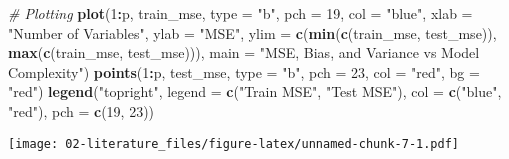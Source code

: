 \documentclass[
]{article}
\newenvironment{Shaded}{\begin{snugshade}}{\end{snugshade}}
\newcommand{\AttributeTok}[1]{\textcolor[rgb]{0.13,0.29,0.53}{#1}}
\newcommand{\CommentTok}[1]{\textcolor[rgb]{0.56,0.35,0.01}{\textit{#1}}}
\newcommand{\DecValTok}[1]{\textcolor[rgb]{0.00,0.00,0.81}{#1}}
\newcommand{\FunctionTok}[1]{\textcolor[rgb]{0.13,0.29,0.53}{\textbf{#1}}}
\newcommand{\NormalTok}[1]{#1}
\newcommand{\SpecialCharTok}[1]{\textcolor[rgb]{0.81,0.36,0.00}{\textbf{#1}}}
\newcommand{\StringTok}[1]{\textcolor[rgb]{0.31,0.60,0.02}{#1}}
\begin{document}
\begin{Shaded}
\begin{Highlighting}[]
\CommentTok{\# Plotting}
\FunctionTok{plot}\NormalTok{(}\DecValTok{1}\SpecialCharTok{:}\NormalTok{p, train\_mse, }\AttributeTok{type =} \StringTok{"b"}\NormalTok{, }\AttributeTok{pch =} \DecValTok{19}\NormalTok{, }\AttributeTok{col =} \StringTok{"blue"}\NormalTok{, }\AttributeTok{xlab =} \StringTok{"Number of Variables"}\NormalTok{, }\AttributeTok{ylab =} \StringTok{"MSE"}\NormalTok{, }\AttributeTok{ylim =} \FunctionTok{c}\NormalTok{(}\FunctionTok{min}\NormalTok{(}\FunctionTok{c}\NormalTok{(train\_mse, test\_mse)), }\FunctionTok{max}\NormalTok{(}\FunctionTok{c}\NormalTok{(train\_mse, test\_mse))), }\AttributeTok{main =} \StringTok{"MSE, Bias, and Variance vs Model Complexity"}\NormalTok{)}
\FunctionTok{points}\NormalTok{(}\DecValTok{1}\SpecialCharTok{:}\NormalTok{p, test\_mse, }\AttributeTok{type =} \StringTok{"b"}\NormalTok{, }\AttributeTok{pch =} \DecValTok{23}\NormalTok{, }\AttributeTok{col =} \StringTok{"red"}\NormalTok{, }\AttributeTok{bg =} \StringTok{"red"}\NormalTok{)}
\FunctionTok{legend}\NormalTok{(}\StringTok{"topright"}\NormalTok{, }\AttributeTok{legend =} \FunctionTok{c}\NormalTok{(}\StringTok{"Train MSE"}\NormalTok{, }\StringTok{"Test MSE"}\NormalTok{), }\AttributeTok{col =} \FunctionTok{c}\NormalTok{(}\StringTok{"blue"}\NormalTok{, }\StringTok{"red"}\NormalTok{), }\AttributeTok{pch =} \FunctionTok{c}\NormalTok{(}\DecValTok{19}\NormalTok{, }\DecValTok{23}\NormalTok{))}
\end{Highlighting}
\end{Shaded}

\texttt{[image: 02-literature\_files/figure-latex/unnamed-chunk-7-1.pdf]}
\end{document}
